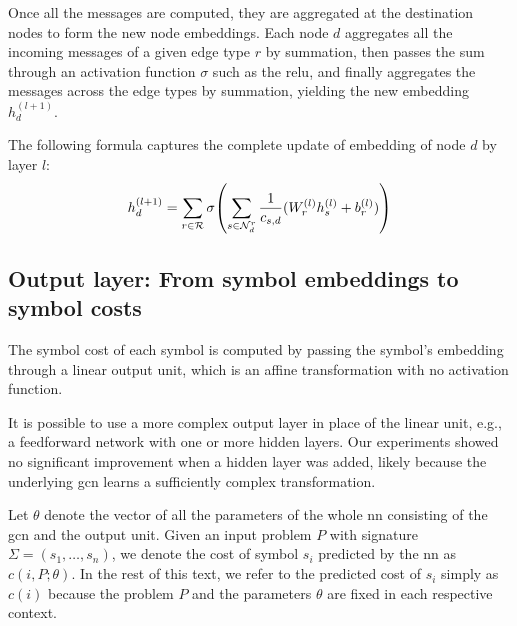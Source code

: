 Once all the messages are computed,
they are aggregated at the destination nodes to form the new node embeddings.
Each node $d$ aggregates all the incoming messages of a given edge type $r$ by summation,
then passes the sum through an activation function $\sigma$ such as the \gls{relu},
and finally aggregates the messages across the edge types by summation,
yielding the new embedding $h_d^{(l+1)}$.

The following formula captures the complete update of embedding of node $d$ by layer $l$:
$$
h_d^{(l+1)} =
\sum_{r \in \mathcal{R}} \sigma \Parentheses*{\sum_{s \in \mathcal{N}_d^r} \frac{1}{c_{s,d}} (W_r^{(l)} h_s^{(l)} + b_r^{(l)})}
$$



\subsection{Output layer: From symbol embeddings to symbol costs}
\label{sec:output}

The symbol cost of each symbol is computed by passing the symbol's embedding through a linear output unit,
which is an affine transformation with no activation function.

It is possible to use a more complex output layer in place of the linear unit,
e.g., a feedforward network with one or more hidden layers.
Our experiments showed no significant improvement when a hidden layer was added,
likely because the underlying \gls{gcn} learns a sufficiently complex transformation.

Let $\theta$ denote the vector of all the parameters of the whole \acrlong{nn} consisting of the \gls{gcn} and the output unit.
Given an input problem $P$ with signature $\Sigma = (s_1, \ldots, s_n)$,
we denote the cost of symbol $s_i$ predicted by the \acrlong{nn} as $c(i, P; \theta)$.
In the rest of this text,
we refer to the predicted cost of $s_i$ simply as $c(i)$
because the problem $P$ and the parameters $\theta$ are fixed in each respective context.

